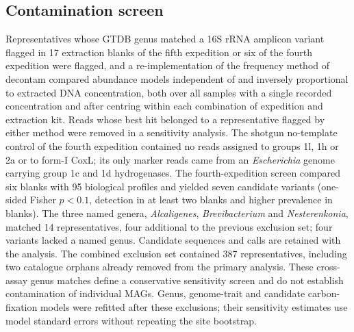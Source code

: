 \documentclass[11pt]{article}
\begin{document}
\subsection*{Contamination screen}
Representatives whose GTDB genus matched a 16S rRNA amplicon variant flagged in 17
extraction blanks of the fifth expedition or six of the fourth expedition were flagged, and a re-implementation of the frequency method of
decontam \citep{davis2018decontam} compared abundance models independent of and inversely proportional to
extracted DNA concentration, both over all samples with a single recorded concentration and after centring
within each combination of expedition and extraction kit. Reads whose best hit belonged to a
representative flagged by either method were removed in a sensitivity analysis. The shotgun no-template
control of the fourth expedition contained no reads assigned to groups 1l, 1h or 2a or to form-I CoxL; its
only marker reads came from an \textit{Escherichia} genome carrying group 1c and 1d hydrogenases.
The fourth-expedition screen compared six blanks with 95 biological profiles and yielded seven candidate
variants (one-sided Fisher $p<0.1$, detection in at least two blanks and higher prevalence in blanks).
The three named genera, \textit{Alcaligenes}, \textit{Brevibacterium} and \textit{Nesterenkonia}, matched
14 representatives, four additional to the previous exclusion set; four variants lacked a named genus.
Candidate sequences and calls are retained with the analysis. The combined exclusion set contained 387
representatives, including two catalogue orphans already removed from the primary analysis.
These cross-assay genus matches define a conservative sensitivity screen and do not establish contamination
of individual MAGs. Genus, genome-trait and candidate carbon-fixation models were refitted after these
exclusions; their sensitivity estimates use model standard errors without repeating the site bootstrap.
\end{document}
